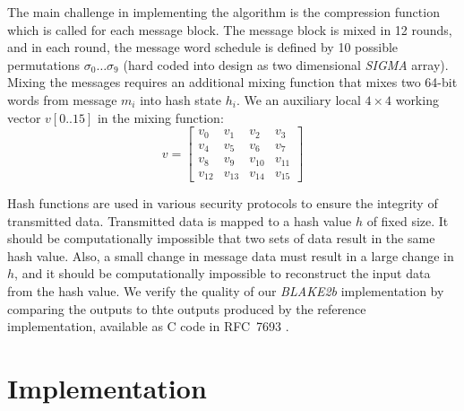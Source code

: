 \documentclass[%
	a4paper,
]
{article}
\begin{document}
The main challenge in implementing the algorithm is the compression function
which is called for each message block.
%
The message block is mixed in 12 rounds, and in each round, the message word
schedule is defined by 10 possible permutations $\sigma_0\dots\sigma_9$ (hard
coded into design as two dimensional \emph{SIGMA} array).
%
Mixing the messages requires an additional mixing function that mixes two
64-bit words from message $m_i$ into hash state $h_i$. We an auxiliary
local $4\times{}4$ working vector $v[0..15]$ in the  mixing function:
\[
   v=
  \left[ {\begin{array}{cccc}
   v_0 & v_1 &v_2 & v_3 \\
   v_4 & v_5 &v_6 & v_7\\
   v_8 & v_9 &v_{10} & v_{11}\\
   v_{12} & v_{13} &v_{14} & v_{15}
  \end{array} } \right]
\]
	    
Hash functions are used in various security protocols to ensure the integrity
of transmitted data. Transmitted data is mapped to a hash value $h$ of fixed
size. It should be computationally impossible that two sets of data
result in the same hash value. Also, a small change in message data must
result in a large change in $h$, and it should be computationally impossible to
reconstruct the input data from the hash value.
%
We verify the quality of our \emph{BLAKE2b} implementation by comparing the
outputs to thte outputs produced by the reference implementation,
available as C code in RFC~7693 \autocite[16-26]{rfc7693}.


%
%
%
\section{Implementation}
\label{sec:implementation}
\end{document}
